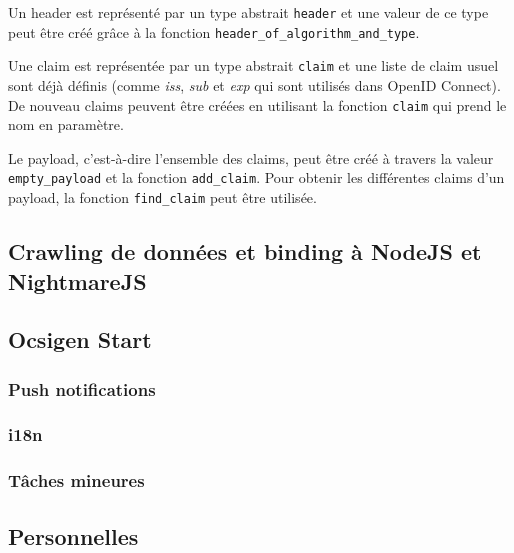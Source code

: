 Un header est représenté par un type abstrait \verb|header| et une valeur de ce
type peut être créé grâce à la fonction \verb|header_of_algorithm_and_type|.

Une claim est représentée par un type abstrait \verb|claim| et une liste de
claim usuel sont déjà définis (comme \emph{iss}, \emph{sub} et \emph{exp} qui
sont utilisés dans OpenID Connect). De nouveau claims peuvent être créées en
utilisant la fonction \verb|claim| qui prend le nom en paramètre. 

Le payload, c'est-à-dire l'ensemble des claims, peut être créé à travers la
valeur \verb|empty_payload| et la fonction \verb|add_claim|.
Pour obtenir les différentes claims d'un payload, la fonction \verb|find_claim|
peut être utilisée.

\subsection{Crawling de données et binding à NodeJS et NightmareJS}

\subsection{Ocsigen Start}


\subsubsection*{Push notifications}

\subsubsection*{i18n}

\subsubsection*{Tâches mineures}

\subsection{Personnelles}

